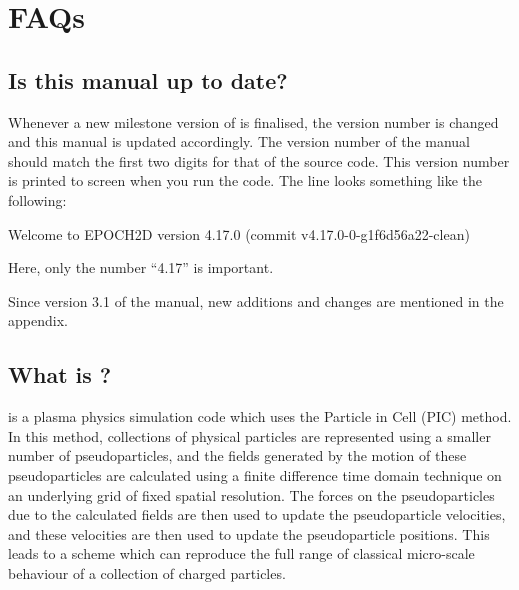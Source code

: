 


%

{
  \selectfont
}
\selectfont%
\tableofcontents%
\newpage%
\DefineShortVerb{\#}

\section{FAQs}

\subsection{Is this manual up to date?}

Whenever a new milestone version of {\EPOCH} is finalised, the version
number is changed and this manual is updated accordingly. The version number
of the manual should match the first two digits for that of the {\EPOCH}
source code.
This version number is printed to screen when you run the code. The line looks
something like the following:
\begin{boxverbatim}
 Welcome to EPOCH2D version 4.17.0   (commit v4.17.0-0-g1f6d56a22-clean)
\end{boxverbatim}
Here, only the number ``4.17'' is important.

Since version 3.1 of the manual, new additions and changes are mentioned
in the appendix.

\subsection{\texorpdfstring
  {What is {\EPOCH}?}
  {What is {EPOCH}?}}

{\EPOCH} is a plasma physics simulation code which uses the Particle in Cell
(PIC) method. In this method, collections of physical particles are represented
using a smaller number of pseudoparticles, and the fields generated by the
motion of these pseudoparticles are calculated using a finite difference time
domain technique on an underlying grid of fixed spatial resolution. The forces
on the pseudoparticles due to the calculated fields are then used to update the
pseudoparticle velocities, and these velocities are then used to update the
pseudoparticle positions. This leads to a scheme which can reproduce the full
range of classical micro-scale behaviour of a collection of charged
particles.

